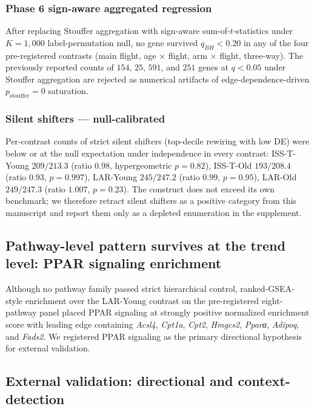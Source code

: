 \documentclass[11pt]{article}
\newcommand{\gene}[1]{\textit{#1}}
\begin{document}
\subsubsection{Phase 6 sign-aware aggregated regression}

After replacing Stouffer aggregation with sign-aware sum-of-$t$-statistics under $K{=}1{,}000$ label-permutation null, no gene survived $q_{BH} < 0.20$ in any of the four pre-registered contrasts (main flight, age $\times$ flight, arm $\times$ flight, three-way). The previously reported counts of $154$, $25$, $591$, and $251$ genes at $q < 0.05$ under Stouffer aggregation are rejected as numerical artifacts of edge-dependence-driven $p_{\text{stouffer}} = 0$ saturation.

\subsubsection{Silent shifters --- null-calibrated}

Per-contrast counts of strict silent shifters (top-decile rewiring with low DE) were below or at the null expectation under independence in every contrast: ISS-T-Young $209/213.3$ (ratio $0.98$, hypergeometric $p = 0.82$), ISS-T-Old $193/208.4$ (ratio $0.93$, $p = 0.997$), LAR-Young $245/247.2$ (ratio $0.99$, $p = 0.95$), LAR-Old $249/247.3$ (ratio $1.007$, $p = 0.23$). The construct does not exceed its own benchmark; we therefore retract silent shifters as a positive category from this manuscript and report them only as a depleted enumeration in the supplement.

\subsection{Pathway-level pattern survives at the trend level: PPAR signaling enrichment}

Although no pathway family passed strict hierarchical control, ranked-GSEA-style enrichment over the LAR-Young contrast on the pre-registered eight-pathway panel placed PPAR signaling at strongly positive normalized enrichment score with leading edge containing \gene{Acsl4}, \gene{Cpt1a}, \gene{Cpt2}, \gene{Hmgcs2}, \gene{Pparα}, \gene{Adipoq}, and \gene{Fads2}. We registered PPAR signaling as the primary directional hypothesis for external validation.

\subsection{External validation: directional and context-detection}
\end{document}
